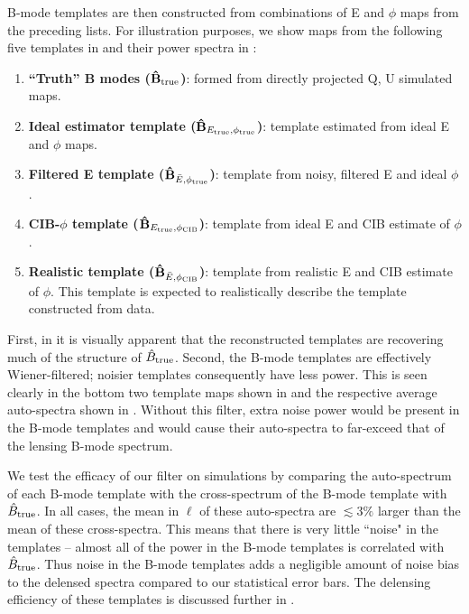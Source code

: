 B-mode templates are then constructed from combinations of E and $\phi$ maps from the preceding lists.
For illustration purposes, we show maps from the following five templates in  and their power spectra in :
\begin{enumerate}[leftmargin=0.5cm]
  \item{\textbf{``Truth'' B modes ($\mathbf{\hat{B}_{\rm true}}$)}: formed from directly projected Q, U simulated maps.}
  \item{\textbf{Ideal estimator template ($\mathbf{\hat{B}}_{E_{\rm true}, \phi_{\rm true}}$)}: template estimated from ideal E and $\phi$ maps.}
  \item{\textbf{Filtered E template ($\mathbf{\hat{B}}_{\bar{E}, \phi_{\rm true}}$)}: template from noisy, filtered E and ideal $\phi$.}

  \item{\textbf{CIB-$\phi$ template ($\mathbf{\hat{B}}_{E_{\rm true}, \phi_{\rm CIB}}$)}: template from ideal E and CIB estimate of $\phi$.}
  \item{\textbf{Realistic template ($\mathbf{\hat{B}}_{\bar{E}, \phi_{\rm CIB}}$)}: template from realistic E and CIB estimate of $\phi$. This template is expected to realistically describe the template constructed from data.}
\end{enumerate}

First, in  it is visually apparent that the reconstructed templates are recovering much of the structure of $\hat{B}_{\rm true}$.
Second, the B-mode templates are effectively Wiener-filtered; noisier templates consequently have less power.
This is seen clearly in the bottom two template maps shown in  and the respective average auto-spectra shown in .
Without this filter, extra noise power would be present in the B-mode templates and would cause their auto-spectra to far-exceed that of the lensing B-mode spectrum.

We test the efficacy of our filter on simulations by comparing the auto-spectrum of each B-mode template with the cross-spectrum of the B-mode template with $\hat{B}_{\rm true}$.
In all cases, the mean in $\ell$ of these auto-spectra are $\lesssim 3\%$ larger than the mean of these cross-spectra.
This means that there is very little ``noise" in the templates -- almost all of the power in the B-mode templates is correlated with $\hat{B}_{\rm true}$.
Thus noise in the B-mode templates adds a negligible amount of noise bias to the delensed spectra compared to our statistical error bars.
The delensing efficiency of these templates is discussed further in .


